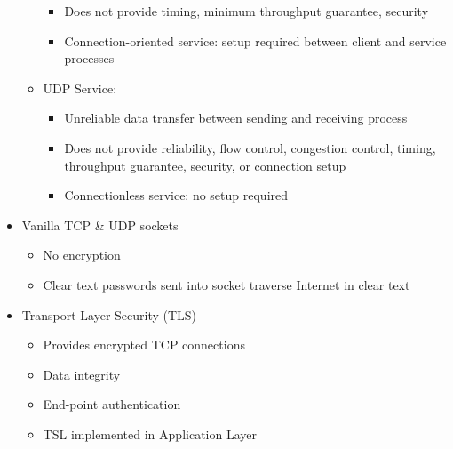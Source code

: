 \begin{itemize}
\begin{itemize}
\begin{itemize}
          \item Does not provide timing, minimum throughput guarantee, security

          \item Connection-oriented service: setup required between client and service processes

        \end{itemize}

      \item UDP Service:

        \begin{itemize}

          \item Unreliable data transfer between sending and receiving process

          \item Does not provide reliability, flow control, congestion control, timing, throughput guarantee, security, or connection setup

          \item Connectionless service: no setup required

        \end{itemize}

    \end{itemize}

  \item Vanilla TCP \& UDP sockets

    \begin{itemize}

      \item No encryption

      \item Clear text passwords sent into socket traverse Internet in clear text

    \end{itemize}

  \item Transport Layer Security (TLS)

    \begin{itemize}

      \item Provides encrypted TCP connections

      \item Data integrity

      \item End-point authentication

      \item TSL implemented in Application Layer


\end{itemize}
\end{itemize}

